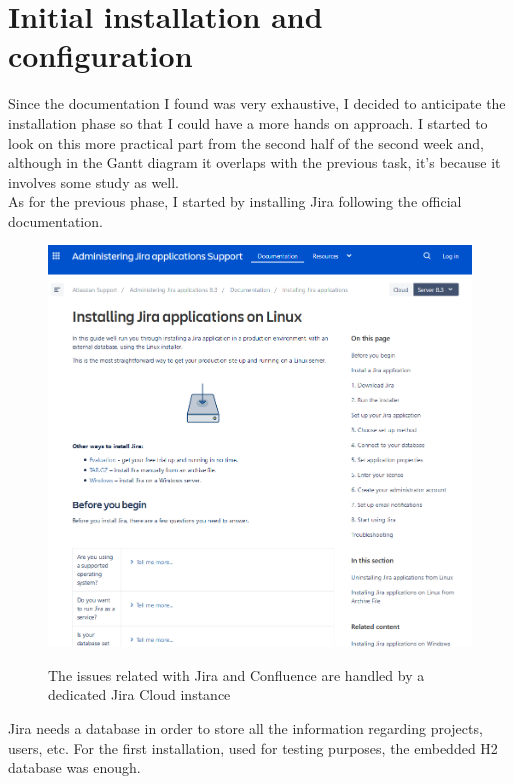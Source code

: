 	
\section{Initial installation and configuration}	
	Since the documentation I found was very exhaustive, I decided to anticipate the installation phase so that I could have a more hands on approach.
	I started to look on this more practical part from the second half of the second week and, although in the Gantt diagram it overlaps with the previous task, it's because it involves some study as well.\\
	As for the previous phase, I started by installing Jira following the official documentation.
	\begin{figure}[H]
		\centering
		\includegraphics[width=1\textwidth]{resources/jira_installation}\\
		\caption{The issues related with Jira and Confluence are handled by a dedicated Jira Cloud instance}
	\end{figure}
	Jira needs a database in order to store all the information regarding projects, users, etc.
	For the first installation, used for testing purposes, the embedded H2 database was enough.

